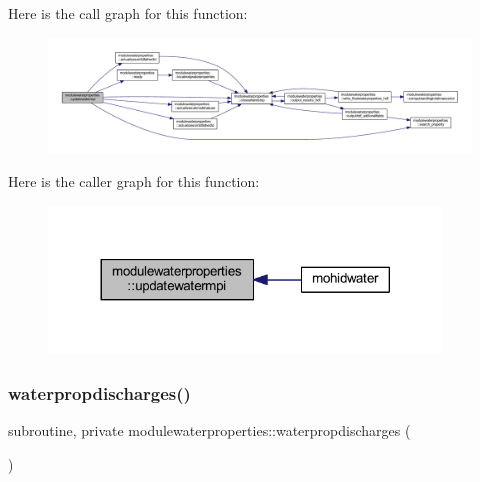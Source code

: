 Here is the call graph for this function\+:\nopagebreak
\begin{figure}[H]
\begin{center}
\leavevmode
\includegraphics[width=350pt]{namespacemodulewaterproperties_a12cedfb20b7e67e1de82bb36c9375e95_cgraph}
\end{center}
\end{figure}
Here is the caller graph for this function\+:\nopagebreak
\begin{figure}[H]
\begin{center}
\leavevmode
\includegraphics[width=296pt]{namespacemodulewaterproperties_a12cedfb20b7e67e1de82bb36c9375e95_icgraph}
\end{center}
\end{figure}
\mbox{\label{namespacemodulewaterproperties_a1198b9575d74a6939f38dcaa6c63f476}} 
\subsubsection{\texorpdfstring{waterpropdischarges()}{waterpropdischarges()}}
{\footnotesize\ttfamily subroutine, private modulewaterproperties\+::waterpropdischarges (\begin{DoxyParamCaption}{ }\end{DoxyParamCaption})\hspace{0.3cm}{\ttfamily [private]}}

